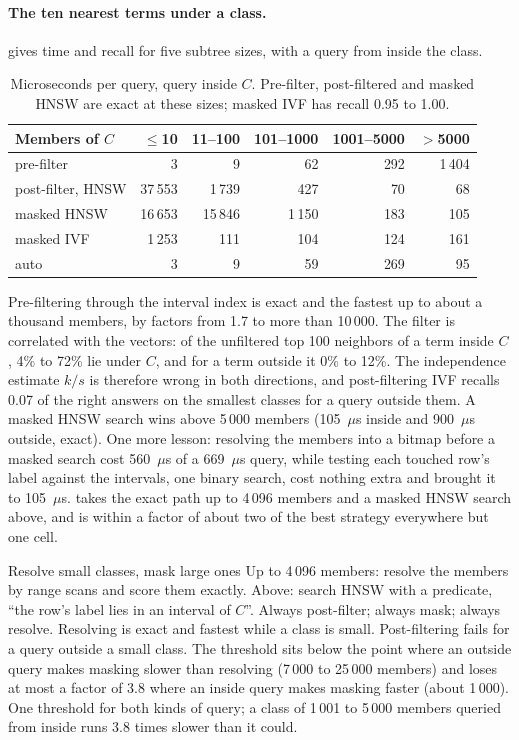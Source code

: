 \paragraph{The ten nearest terms under a class.}  gives
time and recall for five subtree sizes, with a query from inside the class.

\begin{table}[ht]
\centering\small
\begin{tabular}{@{}lrrrrr@{}}
\toprule
Members of $C$ & $\le$10 & 11--100 & 101--1000 & 1001--5000 & $>$5000 \\
\midrule
pre-filter & 3 & 9 & 62 & 292 & 1\,404 \\
post-filter, HNSW & 37\,553 & 1\,739 & 427 & 70 & 68 \\
masked HNSW & 16\,653 & 15\,846 & 1\,150 & 183 & 105 \\
masked IVF & 1\,253 & 111 & 104 & 124 & 161 \\
auto & 3 & 9 & 59 & 269 & 95 \\
\bottomrule
\end{tabular}
\caption{Microseconds per query, query inside $C$. Pre-filter, post-filtered and masked HNSW are exact at these sizes; masked IVF has recall 0.95 to 1.00.}
\label{tab:semantic-hybrid}
\end{table}

Pre-filtering through the interval index is exact and the fastest up to about a
thousand members, by factors from 1.7 to more than 10\,000. The filter is
correlated with the vectors: of the unfiltered top 100 neighbors of a term inside
$C$, 4\% to 72\% lie under $C$, and for a term outside it 0\% to 12\%. The
independence estimate $k/s$ is therefore wrong in both directions, and
post-filtering IVF recalls 0.07 of the right answers on the smallest classes for a
query outside them. A masked HNSW search wins above 5\,000 members (105~$\mu$s inside
and 900~$\mu$s outside, exact). One more lesson: resolving the members into a bitmap
before a masked search cost 560~$\mu$s of a 669~$\mu$s query, while testing each
touched row's label against the intervals, one binary search, cost nothing extra
and brought it to 105~$\mu$s.  takes the exact path up to 4\,096 members
and a masked HNSW search above, and is within a factor of about two of the best
strategy everywhere but one cell.

\begin{decision}{Resolve small classes, mask large ones}
 Up to 4\,096 members: resolve the members by range scans and score
them exactly. Above: search HNSW with a predicate, ``the row's label lies in an
interval of $C$''.
 Always post-filter; always mask; always resolve.
 Resolving is exact and fastest while a class is small. Post-filtering
fails for a query outside a small class. The threshold sits below the point where an
outside query makes masking slower than resolving (7\,000 to 25\,000 members) and
loses at most a factor of 3.8 where an inside query makes masking faster (about
1\,000).
 One threshold for both kinds of query; a class of 1\,001 to 5\,000
members queried from inside runs 3.8 times slower than it could.
\end{decision}


